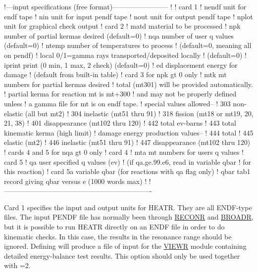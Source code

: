 \small
\begin{ccode}

   !---input specifications (free format)------------------------
   !
   ! card 1
   !    nendf    unit for endf tape
   !    nin      unit for input pendf tape
   !    nout     unit for output pendf tape
   !    nplot    unit for graphical check output
   ! card 2
   !    matd     material to be processed
   !    npk      number of partial kermas desired (default=0)
   !    nqa      number of user q values (default=0)
   !    ntemp    number of temperatures to process
   !             (default=0, meaning all on pendf)
   !    local    0/1=gamma rays transported/deposited locally
   !             (default=0)
   !    iprint   print (0 min, 1 max, 2 check) (default=0)
   !    ed       displacement energy for damage
   !             (default from built-in table)
   ! card 3      for npk gt 0 only
   !    mtk      mt numbers for partial kermas desired
   !             total (mt301) will be provided automatically.
   !             partial kerma for reaction mt is mt+300
   !             and may not be properly defined unless
   !             a gamma file for mt is on endf tape.
   !             special values allowed--
   !               303   non-elastic (all but mt2)
   !               304   inelastic (mt51 thru 91)
   !               318   fission (mt18 or mt19, 20, 21, 38)
   !               401   disappearance (mt102 thru 120)
   !               442   total ev-barns
   !               443   total kinematic kerma (high limit)
   !             damage energy production values--
   !               444   total
   !               445   elastic (mt2)
   !               446   inelastic (mt51 thru 91)
   !               447   disappearance (mt102 thru 120)
   !          cards 4 and 5 for nqa gt 0 only
   ! card 4
   !    mta      mt numbers for users q values
   ! card 5
   !    qa       user specified q values (ev)
   !               (if qa.ge.99.e6, read in variable qbar
   !                  for this reaction)
   ! card 5a     variable qbar (for reactions with qa flag only)
   !    qbar      tab1 record giving qbar versus e (1000 words max)
   !
   !----------------------------------------------------------------

\end{ccode}
\normalsize

Card 1 specifies the input and output units for HEATR.  They
are all ENDF-type files.  The input PENDF file has normally
been through \hyperlink{sRECONRhy}{RECONR} and
\hyperlink{sBROADRhy}{BROADR}, but it is possible to run HEATR
directly on an ENDF file in order to do kinematic checks.  In
this case, the results in the resonance range should be
ignored. Defining  will produce a file of input
for the \hyperlink{sVIEWRhy}{VIEWR} module
containing detailed energy-balance
test results.  This option should only be used together with
=2.

